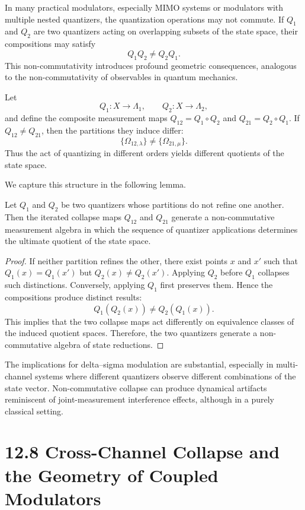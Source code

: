 In many practical modulators, especially MIMO systems or modulators with multiple nested quantizers, the quantization operations may not commute. If $Q_{1}$ and $Q_{2}$ are two quantizers acting on overlapping subsets of the state space, their compositions may satisfy
\[
Q_{1} Q_{2} \neq Q_{2} Q_{1}.
\]
This non-commutativity introduces profound geometric consequences, analogous to the non-commutativity of observables in quantum mechanics.

Let
\[
Q_{1} : X \to \Lambda_{1}, \qquad Q_{2} : X \to \Lambda_{2},
\]
and define the composite measurement maps $Q_{12} = Q_{1} \circ Q_{2}$ and $Q_{21} = Q_{2} \circ Q_{1}$. If $Q_{12} \neq Q_{21}$, then the partitions they induce differ:
\[
\{\Omega_{12,\lambda}\} \neq \{\Omega_{21,\mu}\}.
\]
Thus the act of quantizing in different orders yields different quotients of the state space.

We capture this structure in the following lemma.

\begin{lemma}
Let $Q_{1}$ and $Q_{2}$ be two quantizers whose partitions do not refine one another. Then the iterated collapse maps $Q_{12}$ and $Q_{21}$ generate a non-commutative measurement algebra in which the sequence of quantizer applications determines the ultimate quotient of the state space.
\end{lemma}

\begin{proof}
If neither partition refines the other, there exist points $x$ and $x'$ such that $Q_{1}(x) = Q_{1}(x')$ but $Q_{2}(x) \neq Q_{2}(x')$. Applying $Q_{2}$ before $Q_{1}$ collapses such distinctions. Conversely, applying $Q_{1}$ first preserves them. Hence the compositions produce distinct results:
\[
Q_{1}(Q_{2}(x)) \neq Q_{2}(Q_{1}(x)).
\]
This implies that the two collapse maps act differently on equivalence classes of the induced quotient spaces. Therefore, the two quantizers generate a non-commutative algebra of state reductions.
\end{proof}

The implications for delta--sigma modulation are substantial, especially in multi-channel systems where different quantizers observe different combinations of the state vector. Non-commutative collapse can produce dynamical artifacts reminiscent of joint-measurement interference effects, although in a purely classical setting.

\section*{12.8 Cross-Channel Collapse and the Geometry of Coupled Modulators}

